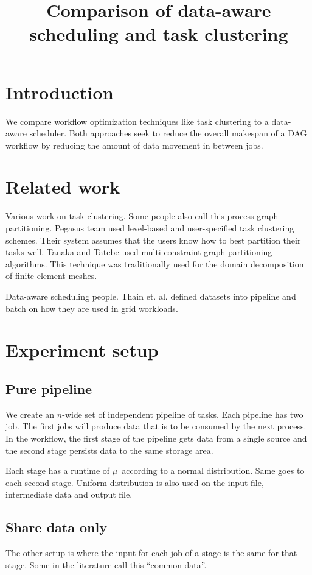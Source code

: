 \documentclass{article}
\title{Comparison of data-aware scheduling and task clustering}
\begin{document}
\section{Introduction} %
\label{sec:introduction}
We compare workflow optimization techniques like task clustering to a data-aware
scheduler.  Both approaches seek to reduce the overall makespan of a DAG
workflow by reducing the amount of data movement in between jobs.


\section{Related work} %
\label{sec:related_work}

Various work on task clustering.  Some people also call this process graph
partitioning.  Pegasus \cite{Singh2008} team used level-based and user-specified
task clustering schemes.  Their system assumes that the users know how to best
partition their tasks well.  Tanaka and Tatebe \cite{Tanaka2012} used
multi-constraint graph partitioning algorithms.  This technique was
traditionally used for the domain decomposition of finite-element meshes.

Data-aware scheduling people.  Thain et. al. \cite{Thain2003} defined datasets
into pipeline and batch on how they are used in grid workloads.  


\section{Experiment setup} %
\label{sec:experiment_setup}

\subsection{Pure pipeline} %
\label{sub:pure_pipeline}


We create an $n$-wide set of independent pipeline of tasks.  Each pipeline has
two job.  The first jobs will produce data that is to be consumed by the next
process.  In the workflow, the first stage of the pipeline gets data from a
single source and the second stage persists data to the same storage area.

Each stage has a runtime of $\mu$~\second according to a normal distribution.
Same goes to each second stage.  Uniform distribution is also used on the input
file, intermediate data and output file.

\subsection{Share data only} %
\label{sub:shared_data_only}

The other setup is where the input for each job of a stage is the same for that
stage.  Some in the literature call this ``common data''.


\end{document}
